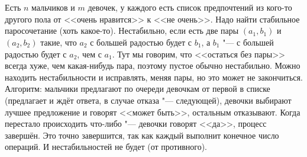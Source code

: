 \section{} %
Есть $n$ мальчиков и $m$ девочек, у каждого есть список предпочтений из кого-то другого пола от <<очень нравится>> к <<не очень>>.
Надо найти стабильное паросочетание (хоть какое-то).
Нестабильно, если есть две пары $(a_1, b_1)$ и $(a_2, b_2)$ такие, что $a_2$ с большей радостью будет с $b_1$, а $b_1$ "--- с большей радостью будет с $a_2$, чем с $a_1$.
Тут мы говорим, что <<остаться без пары>> всегда хуже, чем какая-нибудь пара, поэтому пустое обычно нестабильно.
Можно находить нестабильности и исправлять, меняя пары, но это может не закончиться.
Алгоритм: мальчики предлагают по очереди девочкам от первой в списке (предлагает и ждёт ответа, в случае отказа "--- следующей), девочки выбирают лучшее предложение и говорят <<может быть>>, остальным отказывают.
Когда перестало происходить что-либо "--- девочки говорят <<да>>, процесс завершён.
Это точно завершится, так как каждый выполнит конечное число операций.
И нестабильностей не будет (от противного).
